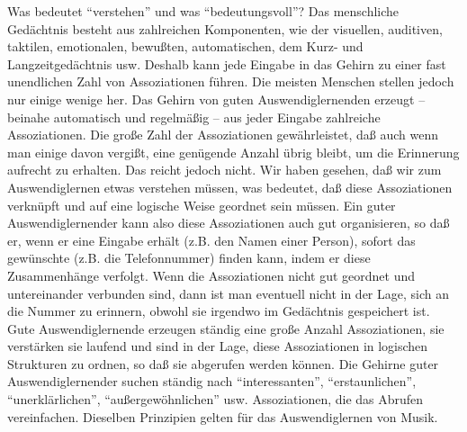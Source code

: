 Was bedeutet \enquote{verstehen} und was \enquote{bedeutungsvoll}?
Das menschliche Gedächtnis besteht aus zahlreichen Komponenten, wie der visuellen, auditiven, taktilen, emotionalen, bewußten, automatischen, dem Kurz- und Langzeitgedächtnis usw.
Deshalb kann jede Eingabe in das Gehirn zu einer fast unendlichen Zahl von Assoziationen führen.
Die meisten Menschen stellen jedoch nur einige wenige her.
Das Gehirn von guten Auswendiglernenden erzeugt -- beinahe automatisch und regelmäßig -- aus jeder Eingabe zahlreiche Assoziationen.
Die große Zahl der Assoziationen gewährleistet, daß auch wenn man einige davon vergißt, eine genügende Anzahl übrig bleibt, um die Erinnerung aufrecht zu erhalten.
Das reicht jedoch nicht.
Wir haben gesehen, daß wir zum Auswendiglernen etwas verstehen müssen, was bedeutet, daß diese Assoziationen verknüpft und auf eine logische Weise geordnet sein müssen.
Ein guter Auswendiglernender kann also diese Assoziationen auch gut organisieren, so daß er, wenn er eine Eingabe erhält (z.B. den Namen einer Person), sofort das gewünschte (z.B. die Telefonnummer) finden kann, indem er diese Zusammenhänge verfolgt.
Wenn die Assoziationen nicht gut geordnet und untereinander verbunden sind, dann ist man eventuell nicht in der Lage, sich an die Nummer zu erinnern, obwohl sie irgendwo im Gedächtnis gespeichert ist.
Gute Auswendiglernende erzeugen ständig eine große Anzahl Assoziationen, sie verstärken sie laufend und sind in der Lage, diese Assoziationen in logischen Strukturen zu ordnen, so daß sie abgerufen werden können.
Die Gehirne guter Auswendiglernender suchen ständig nach \enquote{interessanten}, \enquote{erstaunlichen}, \enquote{unerklärlichen}, \enquote{außergewöhnlichen} usw. Assoziationen, die das Abrufen vereinfachen.
Dieselben Prinzipien gelten für das Auswendiglernen von Musik.


